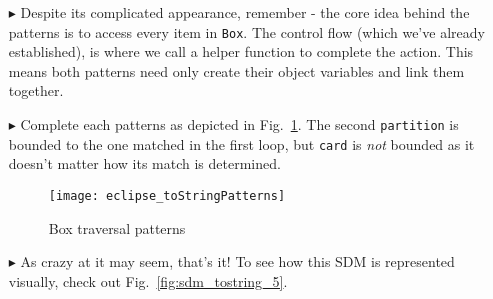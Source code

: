 \begin{itemize}
\item[$\blacktriangleright$] Despite its complicated appearance, remember - the core idea behind the patterns is to access every item in \texttt{Box}. The
control flow (which we've already established), is where we call a helper function to complete the action. This means both patterns need only create their
object variables and link them together.

\item[$\blacktriangleright$] Complete each patterns as depicted in Fig.~\ref{fig:toStringPatterns}. The second \texttt{partition} is bounded to the one matched
in the first loop, but \texttt{card} is \emph{not} bounded as it doesn't matter how its match is determined.

\vspace{0.5cm}

\begin{figure}[htp]
\begin{center}
  \texttt{[image: eclipse\_toStringPatterns]}
  \caption{Box traversal patterns}
  \label{fig:toStringPatterns}
\end{center}
\end{figure}

\vspace{0.5cm}

\item[$\blacktriangleright$] As crazy at it may seem, that's it!  To see how this SDM is represented visually, check out Fig.~\ref{fig:sdm_tostring_5}.

\end{itemize}
